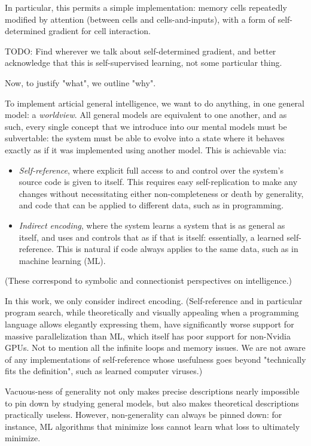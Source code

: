 \documentclass{article}
\begin{document}
In particular, this permits a simple implementation: memory cells repeatedly modified by attention (between cells and cells-and-inputs), with a form of self-determined gradient for cell interaction.

    TODO: Find wherever we talk about self-determined gradient, and better acknowledge that this is self-supervised learning, not some particular thing.

Now, to justify "what", we outline "why".

To implement articial general intelligence, we want to do anything, in one general model: a \textit{worldview}. All general models are equivalent to one another, and as such, every single concept that we introduce into our mental models must be subvertable: the system must be able to evolve into a state where it behaves exactly as if it was implemented using another model. This is achievable via:

\begin{itemize}
\item \textit{Self-reference}, where explicit full access to and control over the system's source code is given to itself. This requires easy self-replication to make any changes without necessitating either non-completeness or death by generality, and code that can be applied to different data, such as in programming.
\item \textit{Indirect encoding}, where the system learns a system that is as general as itself, and uses and controls that as if that is itself: essentially, a learned self-reference. This is natural if code always applies to the same data, such as in machine learning (ML).
\end{itemize}

(These correspond to symbolic and connectionist perspectives on intelligence.)

In this work, we only consider indirect encoding. (Self-reference and in particular program search, while theoretically and visually appealing when a programming language allows elegantly expressing them, have significantly worse support for massive parallelization than ML, which itself has poor support for non-Nvidia GPUs. Not to mention all the infinite loops and memory issues. We are not aware of any implementations of self-reference whose usefulness goes beyond "technically fits the definition", such as learned computer viruses.)

Vacuous-ness of generality not only makes precise descriptions nearly impossible to pin down by studying general models, but also makes theoretical descriptions practically useless. However, non-generality can always be pinned down: for instance, ML algorithms that minimize loss cannot learn what loss to ultimately minimize.
\end{document}
